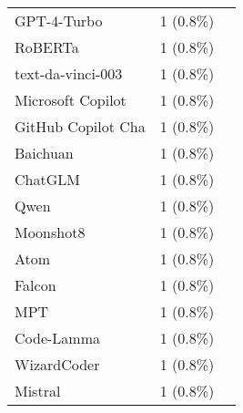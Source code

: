 \begin{table}[ht]
\begin{tabular}{l c p{4cm}}
		GPT-4-Turbo & 1 (0.8\%) & \cite{oli2024automated} \\
		RoBERTa & 1 (0.8\%) & \cite{oli2024automated} \\
		text-da-vinci-003 & 1 (0.8\%) & \cite{prather2024interactions} \\
		Microsoft Copilot & 1 (0.8\%) & \cite{agarwal2024which} \\
		GitHub Copilot Cha & 1 (0.8\%) & \cite{agarwal2024which} \\
		Baichuan & 1 (0.8\%) & \cite{xiao2024qacp} \\
		ChatGLM & 1 (0.8\%) & \cite{xiao2024qacp} \\
		Qwen & 1 (0.8\%) & \cite{xiao2024qacp} \\
		Moonshot8 & 1 (0.8\%) & \cite{xiao2024qacp} \\
		Atom & 1 (0.8\%) & \cite{xiao2024qacp} \\
		Falcon & 1 (0.8\%) & \cite{raihan2024cseprompts} \\
		MPT & 1 (0.8\%) & \cite{raihan2024cseprompts} \\
		Code-Lamma & 1 (0.8\%) & \cite{raihan2024cseprompts} \\
		WizardCoder & 1 (0.8\%) & \cite{raihan2024cseprompts} \\
		Mistral & 1 (0.8\%) & \cite{raihan2024cseprompts} \\
	\bottomrule
    \end{tabular}
    \label{tab:llms}
\end{table}
